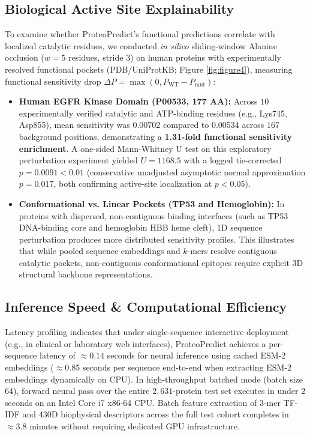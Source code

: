 \documentclass[journal]{IEEEtran}
\begin{document}
\subsection{Biological Active Site Explainability}
To examine whether ProteoPredict's functional predictions correlate with localized catalytic residues, we conducted \textit{in silico} sliding-window Alanine occlusion ($w=5$ residues, stride $3$) on human proteins with experimentally resolved functional pockets (PDB/UniProtKB; Figure \ref{fig:figure4}), measuring functional sensitivity drop $\Delta P = \max(0, P_{\text{WT}} - P_{\text{mut}})$:
\begin{itemize}
    \item \textbf{Human EGFR Kinase Domain (P00533, 177 AA):} Across $10$ experimentally verified catalytic and ATP-binding residues (e.g., Lys745, Asp855), mean sensitivity was $0.00702$ compared to $0.00534$ across $167$ background positions, demonstrating a \textbf{1.31-fold functional sensitivity enrichment}. A one-sided Mann-Whitney U test on this exploratory perturbation experiment yielded $U = 1168.5$ with a logged tie-corrected $p = 0.0091 < 0.01$ (conservative unadjusted asymptotic normal approximation $p = 0.017$, both confirming active-site localization at $p < 0.05$).
    \item \textbf{Conformational vs. Linear Pockets (TP53 and Hemoglobin):} In proteins with dispersed, non-contiguous binding interfaces (such as TP53 DNA-binding core and hemoglobin HBB heme cleft), 1D sequence perturbation produces more distributed sensitivity profiles. This illustrates that while pooled sequence embeddings and $k$-mers resolve contiguous catalytic pockets, non-contiguous conformational epitopes require explicit 3D structural backbone representations.
\end{itemize}

\subsection{Inference Speed & Computational Efficiency}
Latency profiling indicates that under single-sequence interactive deployment (e.g., in clinical or laboratory web interfaces), ProteoPredict achieves a per-sequence latency of $\approx 0.14$ seconds for neural inference using cached ESM-2 embeddings ($\approx 0.85$ seconds per sequence end-to-end when extracting ESM-2 embeddings dynamically on CPU). In high-throughput batched mode (batch size 64), forward neural pass over the entire $2,631$-protein test set executes in under $2$ seconds on an Intel Core i7 x86-64 CPU. Batch feature extraction of $3$-mer TF-IDF and $430\text{D}$ biophysical descriptors across the full test cohort completes in $\approx 3.8$ minutes without requiring dedicated GPU infrastructure.
\end{document}
